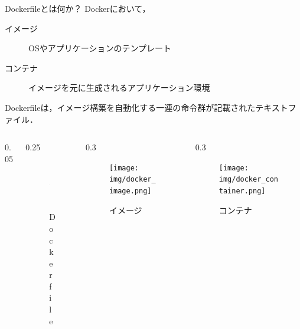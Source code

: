 \documentclass[dvipdfmx, 12pt]{beamer}
\newlength{\mytotalwidth}
\newlength{\mycolumnwidth}
\begin{document}
\begin{frame}{Dockerfileとは何か？}
    Dockerにおいて，
    \begin{description}
        \item[イメージ] OSやアプリケーションのテンプレート
        \item[コンテナ] イメージを元に生成されるアプリケーション環境
    \end{description}

    Dockerfileは，イメージ構築を自動化する一連の命令群が記載されたテキストファイル．

    \begin{columns}[totalwidth=\mytotalwidth]
        \begin{column}[T]{0.05\mycolumnwidth}
        \end{column}
        \begin{column}[T]{0.25\mycolumnwidth}
            \begin{figure}
                \centering
                \includegraphics[height=60pt]{img/dockerfile.png}
                \caption{Dockerfile}
            \end{figure}
        \end{column}
        \begin{column}[T]{0.3\mycolumnwidth}
            \begin{figure}
                \centering
                \texttt{[image: img/docker\_image.png]}
                \caption{イメージ}
            \end{figure}
        \end{column}
        \begin{column}[T]{0.3\mycolumnwidth}
            \begin{figure}
                \centering
                \texttt{[image: img/docker\_container.png]}
                \caption{コンテナ}
            \end{figure}
        \end{column}
    \end{columns}
\end{frame}
\end{document}
